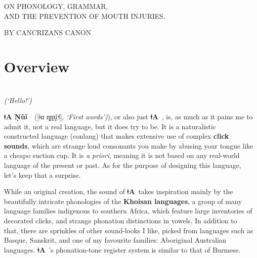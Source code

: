 \documentclass[11pt]{book}
\newcommand{\qcn}[1]{\textbf{#1}}
\newcommand{\langname}{\qcn{ǂA}~}
\newcommand{\langnamelong}{\qcn{ǂA Ṇùĩ}~}
\begin{document}
\pagestyle{empty}




\begin{center}

	\Huge

	\vspace{0.2in}


	\vspace{1in}

	{\Large ON PHONOLOGY, GRAMMAR,\\AND THE PREVENTION OF MOUTH INJURIES.}

	\vfill

	{BY CANCRIZANS CANON}

\end{center}


\pagebreak


\section{Overview}

\begin{center}
	\resizebox{1.5\width}{!}{\qcn{ǃmmǃoi!}}\\
\vspace{1em}
\emph{(`Hello!')}
\end{center}

\vspace{2em}

\langnamelong~([ǂɑ ɳ̰m̩̰ḭ̃˧], \emph{`First words')}), or also just \langname, is, as much as it pains me to admit it, not a real language, but it does try to be. It is a naturalistic constructed language (conlang) that makes extensive use of complex \textbf{click sounds}, which are strange loud consonants you make by abusing your tongue like a cheapo suction cup. It is \emph{a priori}, meaning it is not based on any real-world language of the present or past. As for the purpose of designing this language, let's keep that a surprise.

While an original creation, the sound of \langname takes inspiration mainly by the beautifully intricate phonologies of the \textbf{Khoisan languages}, a group of many language families indigenous to southern Africa, which feature large inventories of decorated clicks, and strange phonation distinctions in vowels. In addition to that, there are sprinkles of other sound-looks I like, picked from languages such as Basque, Sanskrit, and one of my favourite families: Aboriginal Australian languages. \langname's phonation-tone register system is similar to that of Burmese.
\end{document}
